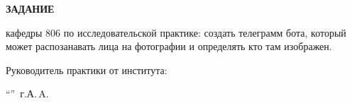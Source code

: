 \begin{center}
\bfseries{\large ЗАДАНИЕ}
\end{center}

кафедры 806 по исследовательской практике: создать телеграмм бота, который может распозанавать лица на фотографии и определять кто там изображен.

\vspace*{\fill}
Руководитель практики от института:

\vspace{5pt}
\enquote{\hspace{0.5cm}}  \the\year\,г. А.\,A. 
\pagebreak
